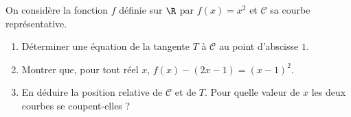 \documentclass[1,exos,b,prof,e]{phBook}
\begin{document}
\begin{exercice}
	On considère la fonction $f$ définie sur $\R$ par $f(x)=x^2$ et $\mathcal{C}$
	sa courbe représentative.
	\begin{enumerate}
		\item Déterminer une équation de la tangente $T$ à $\mathcal{C}$ au point
		d'abscisse $1$.
		\item Montrer que, pour tout réel $x$, $f(x)-(2x-1)=(x-1)^2$.
		\item En déduire la position relative de $\mathcal{C}$ et de $T$. Pour quelle
		valeur de $x$ les deux courbes se coupent-elles ?
	\end{enumerate}

\end{exercice}






\end{document}
